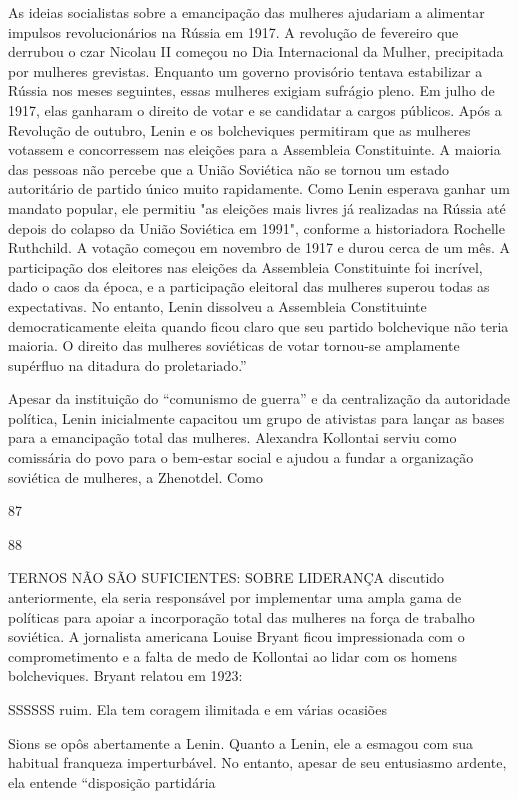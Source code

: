 As ideias socialistas sobre a emancipação das mulheres ajudariam a alimentar impulsos revolucionários na Rússia em 1917. A revolução de fevereiro que derrubou o czar Nicolau II começou no Dia Internacional da Mulher, precipitada por mulheres grevistas. Enquanto um governo provisório tentava estabilizar a Rússia nos meses seguintes, essas mulheres exigiam sufrágio pleno. Em julho de 1917, elas ganharam o direito de votar e se candidatar a cargos públicos. Após a Revolução de outubro, Lenin e os bolcheviques permitiram que as mulheres votassem e concorressem nas eleições para a Assembleia Constituinte. A maioria das pessoas não percebe que a União Soviética não se tornou um estado autoritário de partido único muito rapidamente. Como Lenin esperava ganhar um mandato popular, ele permitiu "as eleições mais livres já realizadas na Rússia até depois do colapso da União Soviética em 1991", conforme a historiadora Rochelle Ruthchild. A votação começou em novembro de 1917 e durou cerca de um mês. A participação dos eleitores nas eleições da Assembleia Constituinte foi incrível, dado o caos da época, e a participação eleitoral das mulheres superou todas as expectativas. No entanto, Lenin dissolveu a Assembleia Constituinte democraticamente eleita quando ficou claro que seu partido bolchevique não teria maioria. O direito das mulheres soviéticas de votar tornou-se amplamente supérfluo na ditadura do proletariado.”
 \par 
Apesar da instituição do “comunismo de guerra” e da centralização da autoridade política, Lenin inicialmente capacitou um grupo de ativistas para lançar as bases para a emancipação total das mulheres. Alexandra Kollontai serviu como comissária do povo para o bem-estar social e ajudou a fundar a organização soviética de mulheres, a Zhenotdel. Como
 \par 
87
 \par 
88
 \par 
TERNOS NÃO SÃO SUFICIENTES: SOBRE LIDERANÇA discutido anteriormente, ela seria responsável por implementar uma ampla gama de políticas para apoiar a incorporação total das mulheres na força de trabalho soviética. A jornalista americana Louise Bryant ficou impressionada com o comprometimento e a falta de medo de Kollontai ao lidar com os homens bolcheviques. Bryant relatou em 1923:
 \par 
SSSSSS ruim. Ela tem coragem ilimitada e em várias ocasiões
 \par 
Sions se opôs abertamente a Lenin. Quanto a Lenin, ele a esmagou com sua habitual franqueza imperturbável. No entanto, apesar de seu entusiasmo ardente, ela entende “disposição partidária
